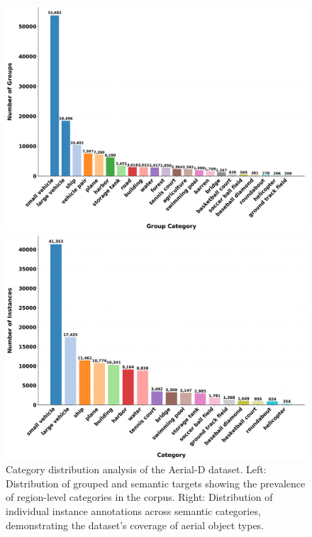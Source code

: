 \documentclass[journal]{IEEEtran}
\begin{document}
\begin{figure}[t]
\centering
\begin{minipage}{0.48\textwidth}
\centering
\includegraphics[width=\textwidth]{./images/group_category_distribution.png}
\end{minipage}\hfill
\begin{minipage}{0.48\textwidth}
\centering
\includegraphics[width=\textwidth]{./images/instance_category_distribution.png}
\end{minipage}
\caption{Category distribution analysis of the Aerial-D dataset. Left: Distribution of grouped and semantic targets showing the prevalence of region-level categories in the corpus. Right: Distribution of individual instance annotations across semantic categories, demonstrating the dataset's coverage of aerial object types.}
\label{fig:category_distributions}
\end{figure}
\end{document}
